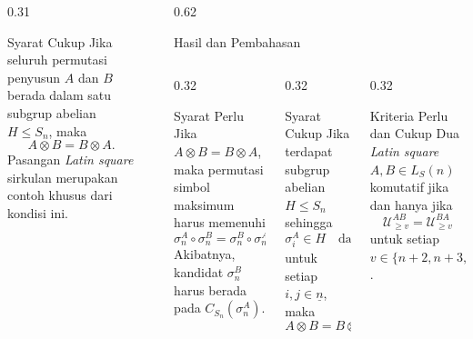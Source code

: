 \documentclass[final]{beamer}
\newlength{\sepwidth}
\newcommand{\separatorcolumn}{\begin{column}{\sepwidth}\end{column}}
\newcommand{\LS}{L_S(n)}
\newcommand{\Sn}{S_n}
\begin{document}
\begin{frame}[t]
\begin{columns}[t]
\begin{column}{0.31\paperwidth}
			\begin{thm}{Syarat Cukup}{}
				Jika seluruh permutasi penyusun $A$ dan $B$ berada dalam satu subgrup
				abelian $H\leq S_n$, maka
				\[
					A\otimes B=B\otimes A.
				\]
				Pasangan \textit{Latin square} sirkulan merupakan contoh khusus dari kondisi ini.
			\end{thm}

		\end{column}

		\separatorcolumn

		\begin{column}{0.62\paperwidth}

			\begin{block}{Hasil dan Pembahasan}
				\begin{columns}[t]
					\begin{column}{0.32\linewidth}
						\begin{defbox}{Syarat Perlu}
							Jika $A\otimes B=B\otimes A$, maka permutasi simbol maksimum
							harus memenuhi
							\[
								\sigma_n^A\circ\sigma_n^B
								=
								\sigma_n^B\circ\sigma_n^A.
							\]
							Akibatnya, kandidat $\sigma_n^B$ harus berada pada
							$C_{\Sn}(\sigma_n^A)$.
						\end{defbox}
					\end{column}

					\begin{column}{0.32\linewidth}
						\begin{defbox}{Syarat Cukup}
							Jika terdapat subgrup abelian $H\leq \Sn$ sehingga
							\[
								\sigma_i^A\in H
								\quad\text{dan}\quad
								\sigma_j^B\in H
							\]
							untuk setiap $i,j\in\underline{n}$, maka
							\[
								A\otimes B=B\otimes A.
							\]
						\end{defbox}
					\end{column}

					\begin{column}{0.32\linewidth}
						\begin{defbox}{Kriteria Perlu dan Cukup}
							Dua \textit{Latin square} $A,B\in\LS$ komutatif jika dan hanya jika
							\[
								\mathcal{U}_{\ge v}^{AB}
								=
								\mathcal{U}_{\ge v}^{BA}
							\]
							untuk setiap $v\in\{n+2,n+3,\ldots,2n\}$.
						\end{defbox}
					\end{column}
				\end{columns}

				\vspace{0.5em}


\end{block}
\end{column}
\end{columns}
\end{frame}
\end{document}
